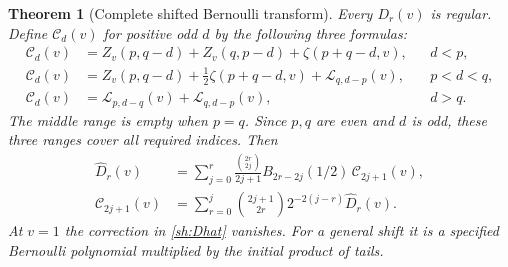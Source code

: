 \documentclass[11pt]{article}
\newtheorem{theorem}{Theorem}[section]
\theoremstyle{definition}
\theoremstyle{remark}
\numberwithin{equation}{section}
\begin{document}
\begin{theorem}[Complete shifted Bernoulli transform]\label{sh:transform}
Every $D_r(v)$ is regular.  Define $\mathcal C_d(v)$ for positive
odd $d$ by the following three formulas:
\begin{align}
 \mathcal C_d(v)
 &=Z_v(p,q-d)+Z_v(q,p-d)+\zeta(p+q-d,v),
 &&d<p,\label{sh:Clow}\\
 \mathcal C_d(v)
 &=Z_v(p,q-d)+\frac12\zeta(p+q-d,v)
                         +\mathcal L_{q,d-p}(v),
 &&p<d<q,\label{sh:Cmiddle}\\
 \mathcal C_d(v)
 &=\mathcal L_{p,d-q}(v)+\mathcal L_{q,d-p}(v),
 &&d>q.\label{sh:Cupper}
\end{align}
The middle range is empty when $p=q$.  Since $p,q$ are even and
$d$ is odd, these three ranges cover all required indices.  Then
\begin{align}
 \widehat D_r(v)
 &=\sum_{j=0}^r
    \frac{\binom{2r}{2j}}{2j+1}
       B_{2r-2j}(1/2)\,\mathcal C_{2j+1}(v),
       \label{sh:forward}\\
 \mathcal C_{2j+1}(v)
 &=\sum_{r=0}^j\binom{2j+1}{2r}
                         2^{-2(j-r)}\widehat D_r(v).
       \label{sh:inverse}
\end{align}
At $v=1$ the correction in \eqref{sh:Dhat} vanishes.  For a
general shift it is a specified Bernoulli polynomial multiplied by
the initial product of tails.
\end{theorem}
\end{document}
